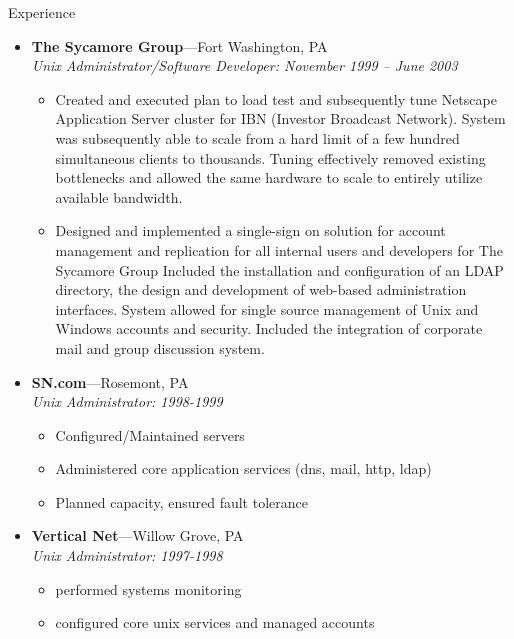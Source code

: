 \documentclass[11pt,oneside]{article}
\newenvironment{ressection}[1]{
	\vspace{4pt}
	{\fontfamily{phv}\selectfont\Large#1}
	\begin{itemize}
	\vspace{3pt}
}{
	\end{itemize}
}
\newcommand{\ressubitem}[1]{
	\vspace{-1pt}
	\item \begin{flushleft} #1 \end{flushleft}
}
\newcommand{\resbigitem}[3]{
	\vspace{-5pt}
	\item
	\textbf{#1}---#2 \\
	\textit{#3}
}
\newenvironment{ressubsec}[3]{
	\resbigitem{#1}{#2}{#3}
	\vspace{-2pt}
	\begin{itemize}
}{
	\end{itemize}
}
\begin{document}
\begin{ressection}{Experience}
\begin{ressubsec}{The Sycamore Group}{Fort Washington, PA}{Unix Administrator/Software Developer: November 1999 -- June 2003}
	  \ressubitem{Created and executed plan to load test and
            subsequently tune Netscape Application Server cluster for
            IBN (Investor Broadcast Network). System was subsequently
            able to scale from a hard limit of a few hundred
            simultaneous clients to thousands. Tuning effectively
            removed existing bottlenecks and allowed the same hardware
            to scale to entirely utilize available bandwidth. }

	  \ressubitem{Designed and implemented a single-sign on
            solution for account management and replication for all
            internal users and developers for The Sycamore Group
            Included the installation and configuration of an LDAP
            directory, the design and development of web-based
            administration interfaces. System allowed for single
            source management of Unix and Windows accounts and
            security. Included the integration of corporate mail and
            group discussion system. }

        \end{ressubsec}

	\begin{ressubsec}{SN.com}{Rosemont, PA}{Unix Administrator: 1998-1999}

	  \ressubitem{Configured/Maintained servers}

	  \ressubitem{Administered core application services (dns, mail, http, ldap)}

	  \ressubitem{Planned capacity, ensured fault tolerance}

	\end{ressubsec}

	\begin{ressubsec}{Vertical Net}{Willow Grove, PA}{Unix Administrator: 1997-1998}

	  \ressubitem{performed systems monitoring}

	  \ressubitem{configured core unix services and managed accounts}

	\end{ressubsec}

\end{ressection}
\end{document}
